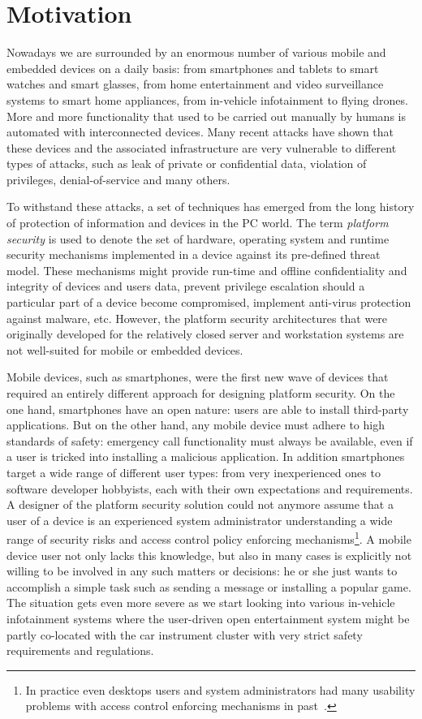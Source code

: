 
\section{Motivation}

Nowadays we are surrounded by an enormous number of various mobile and embedded devices on a daily basis: from smartphones and tablets to smart watches and smart glasses, from home entertainment and video surveillance systems to smart home appliances, from in-vehicle infotainment to flying drones. More and more functionality that used to be carried out manually by humans is automated with interconnected devices. Many recent attacks have shown that these devices and the associated infrastructure are very vulnerable to different types of attacks, such as leak of private or confidential data, violation of privileges, denial-of-service and many others. 

To withstand these attacks, a set of techniques has emerged from the long history of protection of information and devices in the PC world. The term \textit{platform security} is used to denote the set of hardware, operating system and runtime security mechanisms implemented in a device against its pre-defined threat model. These mechanisms might provide run-time and offline confidentiality and integrity of devices and users data, prevent privilege escalation should a particular part of a device become compromised, implement anti-virus protection against malware, etc. However, the platform security architectures that were originally developed for the relatively closed server and workstation systems are not well-suited for mobile or embedded devices. 

Mobile devices, such as smartphones, were the first new wave of devices that required an entirely different approach for designing platform security. On the one hand, smartphones have an open nature: users are able to install third-party applications. But on the other hand, any mobile device must adhere to high standards of safety: emergency call functionality must always be available, even if a user is tricked into installing a malicious application. In addition smartphones target a wide range of different user types: from very inexperienced ones to software developer hobbyists, each with their own expectations and requirements. A designer of the platform security solution could not anymore assume that a user of a device is an experienced system administrator understanding a wide range of security risks and access control policy enforcing mechanisms\footnote{In practice even desktops users and system administrators had many usability problems with access control enforcing mechanisms in past~\cite{li2007usable}.}. A mobile device user not only lacks this knowledge, but also in many cases is explicitly not willing to be involved in any such matters or decisions: he or she just wants to accomplish a simple task such as sending a message or installing a popular game. The situation gets even more severe as we start looking into various in-vehicle infotainment systems where the user-driven open entertainment system might be partly co-located with the car instrument cluster with very strict safety requirements and regulations. 

